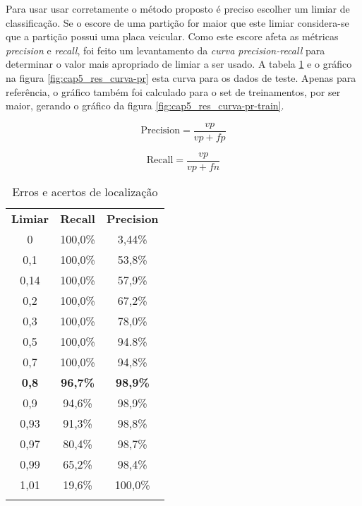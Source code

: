 Para usar usar corretamente o método proposto é preciso escolher um limiar de
classificação. Se o escore de uma partição for maior que este limiar
considera-se que a partição possui uma placa veicular. Como este escore afeta
as métricas \emph{precision} e \emph{recall}, foi feito um levantamento da
\emph{curva precision-recall} para determinar o valor mais apropriado de limiar
a ser usado. A tabela \ref{tbl:curva-pr} e o gráfico na figura
\ref{fig:cap5_res_curva-pr} esta curva para os dados de teste. Apenas para
referência, o gráfico também foi calculado para o set de treinamentos, por ser
maior, gerando o gráfico da figura \ref{fig:cap5_res_curva-pr-train}.

\noindent\begin{minipage}{.5\linewidth}
	\begin{equation} \label{eq:precision}
		\text{Precision} = \frac{vp}{vp + fp}
	\end{equation}
\end{minipage}
\begin{minipage}{.5\linewidth}
	\begin{equation} \label{eq:recall}
		\text{Recall} = \frac{vp}{vp + fn}
	\end{equation}
\end{minipage}

\begin{table}
	\center
	\caption{Erros e acertos de localização}
	\renewcommand{\arraystretch}{1.6}
	\begin{tabular}{ccc}
		\Xhline{6\arrayrulewidth}
		\textbf{Limiar} &
			\textbf{Recall} &
			\textbf{Precision} \\
		\Xhline{2\arrayrulewidth}
			0    & 100,0\%  &  3,44\% \\
			0,1  & 100,0\%  &  53,8\% \\
			0,14 & 100,0\%  &  57,9\% \\
			0,2  & 100,0\%  &  67,2\% \\
			0,3  & 100,0\%  &  78,0\% \\
			0,5  & 100,0\%  &  94.8\% \\
			0,7  & 100,0\%  &  94,8\% \\
			\textbf{0,8}  &  \textbf{96,7\%}  &  \textbf{98,9\%} \\
			0,9  &  94,6\%  &  98,9\% \\
			0,93 &  91,3\%  &  98,8\% \\
			0,97 &  80,4\%  &  98,7\% \\
			0,99 &  65,2\%  &  98,4\% \\
			1,01 &  19,6\%  & 100,0\% \\
		\Xhline{6\arrayrulewidth}
	\end{tabular}
	\label{tbl:curva-pr}
\end{table}

